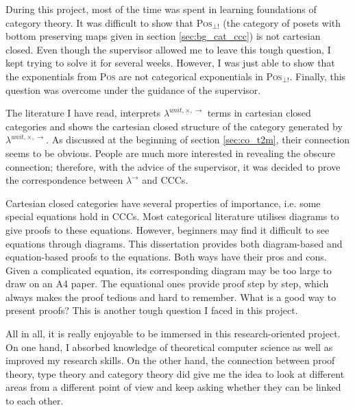 During this project, most of the time was spent in learning foundations of category theory. It was difficult to show that \textsc{Pos}$_{\bot !}$ (the category of posets with bottom preserving maps given in section \ref{sec:bg_cat_ccc}) is not cartesian closed. Even though the supervisor allowed me to leave this tough question, I kept trying to solve it for several weeks. However, I was just able to show that the exponentials from \textsc{Pos} are not categorical exponentials in \textsc{Pos}$_{\bot !}$. Finally, this question was overcome under the guidance of the supervisor.

The literature \cite{AL91,BW95,LS86,Mit96} I have read, interprets $ \lambda^{unit,\times,\to} $ terms in cartesian closed categories and shows the cartesian closed structure of the category generated by $ \lambda^{unit,\times,\to} $. As discussed at the beginning of section \ref{sec:co_t2m}, their connection seems to be obvious. People are much more interested in revealing the obscure connection; therefore, with the advice of the supervisor, it was decided to prove the correspondence between $ \lambda^{\to} $ and CCCs.

Cartesian closed categories have several properties of importance, i.e. some special equations hold in CCCs. Most categorical literature utilises diagrams to give proofs to these equations. However, beginners may find it difficult to see equations through diagrams. This dissertation provides both diagram-based and equation-based proofs to the equations. Both ways have their pros and cons. Given a complicated equation, its corresponding diagram may be too large to draw on an A4 paper. The equational ones provide proof step by step, which always makes the proof tedious and hard to remember. What is a good way to present proofs? This is another tough question I faced in this project.

All in all, it is really enjoyable to be immersed in this research-oriented project. On one hand, I absorbed knowledge of theoretical computer science as well as improved my research skills. On the other hand, the connection between proof theory, type theory and category theory did give me the idea to look at different areas from a different point of view and keep asking whether they can be linked to each other.